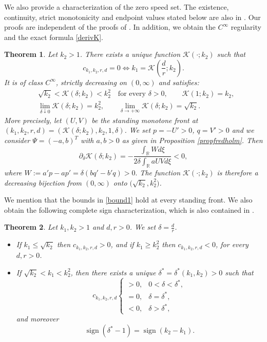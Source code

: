 \documentclass[11pt]{article}
\numberwithin{equation}{section}
\newcommand{\1}{\mathbbm{1}}
\numberwithin{equation}{section}
\newtheorem{theorem}{Theorem}[section]
\theoremstyle{definition}
\def \dis {\displaystyle}
\newcommand{\sgn}{\operatorname{sign}}
\def \R {\mathbb{R}}
\def \K {\mathcal{K}}
\def \c{c_{k_1,k_2,r,d}}
\numberwithin{equation}{section}
\def \dis {\displaystyle}
\begin{document}
We also provide a characterization of the zero speed set. The existence, continuity, strict monotonicity and endpoint values stated below are also in \cite[Theorem 1.3]{ma2026}. Our proofs are independent of the proofs of \cite{ma2026}. In addition, we obtain  the $C^\infty$ regularity and the exact formula \eqref{derivK}. 
\begin{theorem}\label{maintheorem1}
	Let $k_2>1$. There exists a unique function $\K(\cdot;k_2)$ such that
	\begin{equation}\label{zeroarie}
	\c=0\Longleftrightarrow k_1=\K\left(\frac{d}{r};k_2\right).
	\end{equation}
It is of class $C^\infty$, strictly decreasing on $(0,\infty)$ and satisfies:
	\begin{align}
		&\sqrt{k_2}<\K(\delta;k_2)<k_2^{2}\quad\text{for every }\delta>0,\qquad \K(1;k_2)=k_2,
		\label{bound1}\\
		&\lim_{\delta\downarrow0}\K(\delta;k_2)=k_2^{2},\qquad
		\lim_{\delta\to+\infty}\mathcal K(\delta;k_2)=\sqrt{k_2}.\label{limit1}
	\end{align}
	More precisely, let  $(U,V)$ be the standing monotone front at
	$(k_1,k_2,r,d)=(\K(\delta;k_2),k_2, 1,\delta)$. We set $p=-U'>0$, $q=V'>0$  and we consider
	$\Psi=(-a,b)^T$ with $a,b>0$ as given in Proposition \ref{propfredholm}. Then
	\begin{equation}\label{derivK}
	\partial_\delta\K(\delta;k_2) =-\frac{\dis\int_\R Wd\xi}{2\delta\dis\int_\R aUVd\xi}<0,
	\end{equation}
	where $W:=a'p-ap'=\delta(bq'-b'q)>0.$
The function $\K(\cdot; k_2)$ is therefore a decreasing bijection from $(0,\infty)$ onto $\bigl(\sqrt{k_2},k_2^{2}\bigr)$.
\end{theorem}
We mention that the bounds in \eqref{bound1} hold at every standing front. 
We also obtain the following complete sign characterization, which is also contained in \cite[Corollary 1.4]{ma2026}.
\begin{theorem}\label{maintheorem2}
	Let $k_1,k_2>1$ and $d,r>0$. We set $\delta=\frac{d}{r}$. 
	\begin{itemize}
		\item [$(i)$] If $k_1\le\sqrt{k_2}$ then $\c>0$, and if $k_1\ge k_2^{2}$ then $\c<0$, for every $d,r>0$.
		\item[$(ii)$] If $\sqrt{k_2}<k_1<k_2^{2}$, then there exists a unique $\delta^*=\delta^*(k_1,k_2)>0$ such
		that
		\begin{equation}\label{eq6}
			\c\begin{cases}>0,&0<\delta<\delta^*,\\ =0,&\delta=\delta^*,\\ <0,&\delta>\delta^*,\end{cases}
		\end{equation}
		and moreover
		\begin{equation}\label{eq7}
			\sgn(\delta^*-1)=\sgn(k_2-k_1).
		\end{equation}
	\end{itemize}
\end{theorem}
\end{document}
